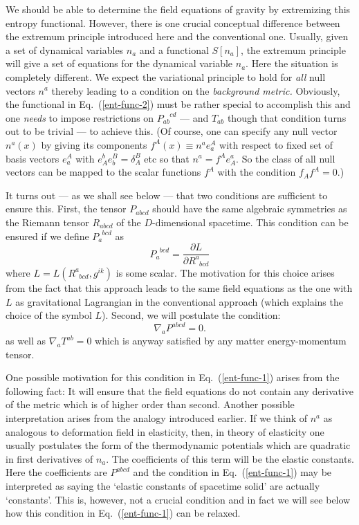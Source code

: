 \documentclass[12pt]{iopart}
\def\eq#1{{Eq.~(\ref{#1})}}
\newcommand{\ph}[1]{\phantom{#1}}
\newcommand{\D}{\ensuremath{\nabla}}
\begin{document}
We should be able to determine the field equations of gravity by extremizing this entropy functional. However, there is one 
 crucial conceptual difference 
between the extremum principle introduced here and the conventional one. Usually, given a set of dynamical variables $n_a$ and a functional $S[n_a]$, the extremum principle will give a set of equations for the dynamical variable $n_a$. Here the situation is completely different. We expect the variational principle to hold for   \textit{all} null vectors $n^a$ thereby  leading  to a condition on  the \textit{background
metric.} Obviously, the functional in \eq{ent-func-2} must be rather special to accomplish this and one \textit{needs} to impose  restrictions on  $P_{ab}^{\ph{a}\ph{b}cd}$ --- and $T_{ab}$ though that condition turns out to be trivial --- to achieve this.
(Of course, one can specify any null vector $n^a(x)$ by giving its components $f^A(x)\equiv n^ae_a^A$ with respect to fixed set of basis vectors $e_a^A$ with $e_A^be_b^B=\delta^B_A$ etc so that $n^a=f^Ae_A^a$. So the class of all null vectors can be mapped to the scalar functions $f^A$ with the condition $f_Af^A=0$.)

It turns out --- as we shall see below --- that two conditions are sufficient
to ensure this.
First, the tensor $P_{abcd}$ should
have the same algebraic symmetries as the Riemann tensor $R_{abcd}$
of the $D$-dimensional spacetime. 
This condition can be ensured if we define $P_a^{\phantom{a}bcd}$ as
\begin{equation}
P_a^{\phantom{a}bcd} = \frac{\partial L}{\partial R^a_{\phantom{a}bcd}}
\label{condd1}
\end{equation} 
where $L = L(R^a_{\phantom{a}bcd}, g^{ik})$ is some scalar. 
The motivation for this choice
arises from the fact that this approach leads to the same field equations as the one with $L$ as gravitational Lagrangian in the conventional approach (which explains the choice of the symbol $L$).
Second, we will postulate the condition:
\begin{equation}
\D_{a}P^{abcd}=0.
\label{ent-func-1}
\end{equation}
as well as $\D_{a}T^{ab}=0$ which is anyway satisfied by any matter energy-momentum tensor.

One possible motivation for this condition in \eq{ent-func-1} arises from the
 following fact: It will ensure that the field equations do not contain any derivative of the metric which is of higher order than second. Another possible interpretation arises from the 
 analogy introduced earlier.
If we think of $n^a$ as analogous to deformation field in elasticity, then, in theory of elasticity \cite{landau7} one usually postulates the form of the thermodynamic potentials which are quadratic in first derivatives of $n_a$. The coefficients of this term will be the elastic constants. Here the coefficients are $P^{abcd}$
and the condition in  \eq{ent-func-1}
may be interpreted 
as saying the `elastic constants of spacetime solid' are actually `constants'. 
This is, however, not a crucial condition and in fact we will see below how this condition in \eq{ent-func-1} can be relaxed. 
\end{document}
